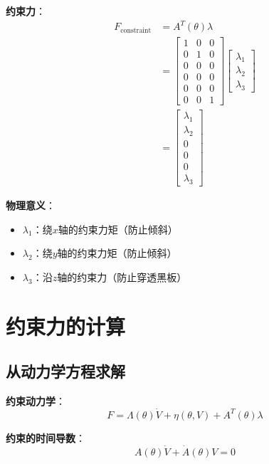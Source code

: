 \documentclass[12pt,a4paper]{article}
\begin{document}
\textbf{约束力}：
\begin{align}
F_{\text{constraint}} &= A^T(\theta)\lambda \\
&= \begin{bmatrix}
1 & 0 & 0 \\
0 & 1 & 0 \\
0 & 0 & 0 \\
0 & 0 & 0 \\
0 & 0 & 0 \\
0 & 0 & 1
\end{bmatrix} \begin{bmatrix}
\lambda_1 \\
\lambda_2 \\
\lambda_3
\end{bmatrix} \\
&= \begin{bmatrix}
\lambda_1 \\  %
\lambda_2 \\  %
0 \\          %
0 \\          %
0 \\          %
\lambda_3     %
\end{bmatrix}
\end{align}

\textbf{物理意义}：
\begin{itemize}
\item $\lambda_1$：绕$x$轴的约束力矩（防止倾斜）
\item $\lambda_2$：绕$y$轴的约束力矩（防止倾斜）
\item $\lambda_3$：沿$z$轴的约束力（防止穿透黑板）
\end{itemize}

\section{约束力的计算}

\subsection{从动力学方程求解}

\textbf{约束动力学}：
\begin{equation}
F = \Lambda(\theta)\dot{V} + \eta(\theta, V) + A^T(\theta)\lambda
\end{equation}

\textbf{约束的时间导数}：
\begin{equation}
A(\theta)\dot{V} + \dot{A}(\theta)V = 0
\end{equation}
\end{document}
